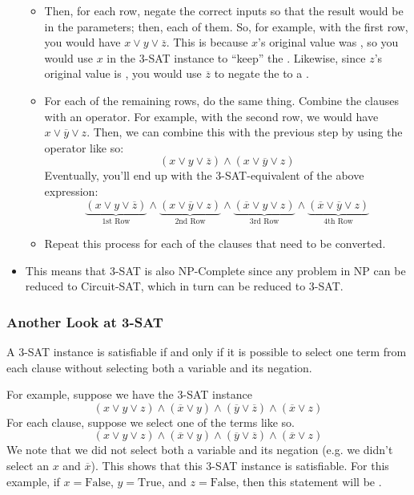 \documentclass[letterpaper]{article}
\begin{document}
\begin{itemize}
\begin{mdframed}[]
\begin{itemize}
            \item Then, for each row, negate the correct inputs so that the result would be  in the parameters; then,  each of them. So, for example, with the first row, you would have $x \lor y \lor \overline{z}$. This is because $x$'s original value was , so you would use $x$ in the 3-SAT instance to ``keep'' the . Likewise, since $z$'s original value is , you would use $\overline{z}$ to negate the  to a . 
            \item For each of the remaining rows, do the same thing. Combine the clauses with an  operator. For example, with the second row, we would have $x \lor \overline{y} \lor z$. Then, we can combine this with the previous step by using the  operator like so: 
            \[(x \lor y \lor \overline{z}) \land (x \lor \overline{y} \lor z)\]
            Eventually, you'll end up with the 3-SAT-equivalent of the above expression:
            \[\underbrace{(x \lor y \lor \overline{z})}_{\text{1st Row}} \land \underbrace{(x \lor \overline{y} \lor z)}_{\text{2nd Row}} \land \underbrace{(\overline{x} \lor y \lor z)}_{\text{3rd Row}} \land \underbrace{(\overline{x} \lor \overline{y} \lor z)}_{\text{4th Row}}\]
            \item Repeat this process for each of the clauses that need to be converted. 
        \end{itemize}
    \end{mdframed}

    \item This means that 3-SAT is also NP-Complete since any problem in NP can be reduced to Circuit-SAT, which in turn can be reduced to 3-SAT.
\end{itemize}

\subsubsection{Another Look at 3-SAT}
\begin{lemma}{}{}
    A 3-SAT instance is satisfiable if and only if it is possible to select one term from each clause without selecting both a variable and its negation. 
\end{lemma}

For example, suppose we have the 3-SAT instance 
\[(x \lor y \lor z) \land (\overline{x} \lor y) \land (\overline{y} \lor \overline{z}) \land (\overline{x} \lor z)\]
For each clause, suppose we select one of the terms like so.  
\[(x \lor \boxed{y} \lor z) \land (\boxed{\overline{x}} \lor y) \land (\overline{y} \lor \boxed{\overline{z}}) \land (\boxed{\overline{x}} \lor z)\]
We note that we did not select both a variable and its negation (e.g. we didn't select an $x$ and $\overline{x}$). This shows that this 3-SAT instance is satisfiable. For this example, if $x = \text{False}$, $y = \text{True}$, and $z = \text{False}$, then this statement will be .
\end{document}
